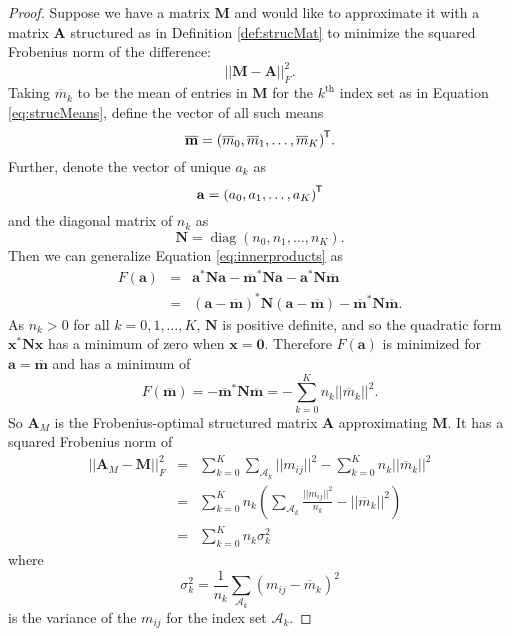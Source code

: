 \documentclass[letterpaper,12pt,oneside,final]{article}
\newcommand{\ve}[1]{\mathbf{#1}}           %
\newcommand{\m}[1]{\mathbf{#1}}               %
\newcommand{\tr}[1]{{#1}^{\mkern-1.5mu\mathsf{T}}}              %
\newcommand{\conj}[1]{{#1}^{\ast}}
\newcommand{\norm}[1]{||{#1}||}              %
\newcommand{\frob}[1]{\norm{#1}_F}
\newcommand*{\diag}{\operatorname{diag}}
\newcommand{\widebar}[1]{\overline{#1}}
\begin{document}
\begin{proof}
  Suppose we have a matrix $\m{M}$ and would like to approximate it with a matrix $\m{A}$ structured as in Definition \ref{def:strucMat} to minimize the squared Frobenius norm of the difference:
  $$\frob{\m{M} - \m{A}}^2.$$
  Taking $\widebar{m}_k$ to be the mean of entries in $\m{M}$ for the $k^{\text{th}}$ index set as in Equation \ref{eq:strucMeans}, define the vector of all such means
  \begin{equation*}
    \widebar{ \ve{m} } = \tr{ (\widebar{m}_0, \widebar{m}_1, \dots, \widebar{m}_K) }.
  \end{equation*}
  Further, denote the vector of unique $a_k$ as
  \begin{equation*}
    \ve{a} = \tr{ ( a_0, a_1, \dots, a_K ) }
  \end{equation*}
  and the diagonal matrix of $n_k$ as
  \begin{equation*}
    \m{N} = \diag (n_0, n_1, \dots, n_K).
  \end{equation*}
  Then we can generalize Equation \ref{eq:innerproducts} as
\begin{eqnarray}
  F(\ve{a}) & = & \conj{ \ve{a} } \m{N} \ve{a} - \conj{ \widebar { \ve{m} } } \m{N} \ve{a} - \conj{ \ve{a} } \m{N} \widebar{ \ve{m} } \nonumber \\
  & = & \conj{ \left ( \ve{a} - \widebar{ \ve{m} } \right ) } \m{N}  \left ( \ve{a} - \widebar{ \ve{m} } \right ) - \conj{ \widebar{ \ve{m} } } \m{N} \widebar{ \ve{m} }.
\end{eqnarray}
As $n_k > 0$ for all $k = 0, 1, \dots, K$, $\m{N}$ is positive definite, and so the quadratic form $\conj{ \ve{x} } \m{N} \ve{x}$ has a minimum of zero when $\ve{x} = \ve{0}$. Therefore $F(\ve{a})$ is minimized for $\ve{a} = \widebar{ \ve{ m } }$ and has a minimum of
\begin{equation} \label{eq:Fmin}
  F(\widebar{ \ve{m} }) = - \conj{ \widebar{ \ve{m} } } \m{N} \widebar{ \ve{m} } = - \sum_{k = 0}^K n_k \norm{\widebar{m}_k}^2.
\end{equation}
So $\m{A}_M$ is the Frobenius-optimal structured matrix $\m{A}$ approximating $\m{M}$. It has a squared Frobenius norm of
\begin{eqnarray}
  \frob{\m{A}_M - \m{M}}^2 & = & \sum_{k = 0}^K \sum_{\mathcal{A}_k} \norm{m_{ij}}^2 - \sum_{k = 0}^K n_k \norm{\widebar{m}_k}^2 \nonumber \\
  & = & \sum_{k = 0}^K n_k \left ( \sum_{\mathcal{A}_k} \frac{\norm{m_{ij}}^2}{n_k} - \norm{\widebar{m}_k}^2  \right ) \nonumber \\
  & = & \sum_{k = 0}^K n_k \sigma_k^2 \label{eq:AMmin}
\end{eqnarray}
where
$$\sigma_k^2 = \frac{1}{n_k} \sum_{\mathcal{A}_k} \left ( m_{ij} - \widebar{m}_k \right ) ^2$$
is the variance of the $m_{ij}$ for the index set $\mathcal{A}_k$.
\end{proof}
\end{document}
